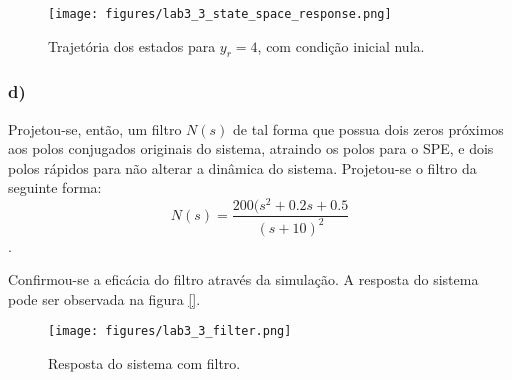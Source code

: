 \documentclass[a4paper]{report}
\begin{document}
\begin{figure}[H]
    \centering
    \texttt{[image: figures/lab3\_3\_state\_space\_response.png]}
    \caption{Trajetória dos estados para $y_r=4$, com condição inicial nula.}
    \label{fig:figures-lab3_3_state_space_response-png}
\end{figure}

\subsubsection*{d)}

Projetou-se, então, um filtro $N(s)$ de tal forma que possua dois zeros próximos aos polos conjugados originais do sistema, atraindo os polos para o SPE, e dois polos rápidos para não alterar a dinâmica do sistema. Projetou-se o filtro da seguinte forma: \[
    N(s) = \frac{200(s^{2}+0.2s+0.5}{(s+10)^2}
\].

Confirmou-se a eficácia do filtro através da simulação. A resposta do sistema pode ser observada na figura \ref{}.

\begin{figure}[H]
    \centering
    \texttt{[image: figures/lab3\_3\_filter.png]}
    \caption{Resposta do sistema com filtro.}
    \label{fig:figures-lab3_3_filter-png}
\end{figure}
\end{document}
